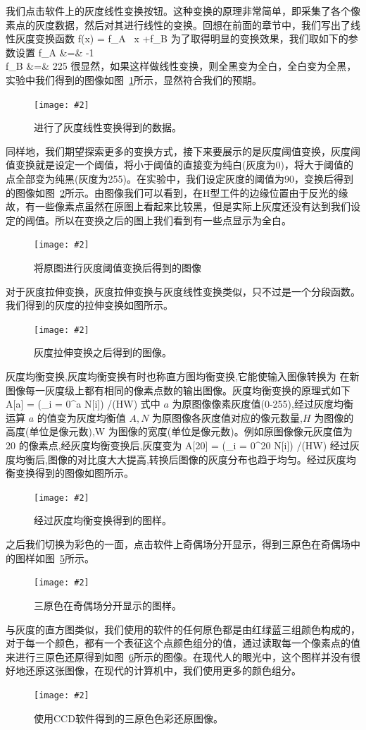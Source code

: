 \documentclass{ctexart}
\newcommand{\cpic}[2]{
\begin{center}
\texttt{[image: \#2]}
\end{center}
}
\newcommand{\cpicn}[3]
{
\begin{figure}[H]
\cpic{#1}{#2}
\caption{#3\label{#2}}
\end{figure}
}
\begin{document}
我们点击软件上的灰度线性变换按钮。这种变换的原理非常简单，即采集了各个像素点的灰度数据，然后对其进行线性的变换。回想在前面的章节中，我们写出了线性灰度变换函数
\beq
f(x) = f_A \, x +f_B
\eeq
为了取得明显的变换效果，我们取如下的参数设置
\bea
f_A &=& -1\\
f_B &=& 225
\eea
很显然，如果这样做线性变换，则全黑变为全白，全白变为全黑，实验中我们得到的图像如图~\ref{CCD/灰度线性变换}所示，显然符合我们的预期。
\cpicn{0.5}{CCD/灰度线性变换}{进行了灰度线性变换得到的数据。}

同样地，我们期望探索更多的变换方式，接下来要展示的是灰度阈值变换，灰度阈值变换就是设定一个阈值，将小于阈值的直接变为纯白(灰度为0)，将大于阈值的点全部变为纯黑(灰度为255)。在实验中，我们设定灰度的阈值为90，变换后得到的图像如图~\ref{CCD/灰度阈值变换}所示。由图像我们可以看到，在H型工件的边缘位置由于反光的缘故，有一些像素点虽然在原图上看起来比较黑，但是实际上灰度还没有达到我们设定的阈值。所以在变换之后的图上我们看到有一些点显示为全白。
\cpicn{0.5}{CCD/灰度阈值变换}{将原图进行灰度阈值变换后得到的图像}

对于灰度拉伸变换，灰度拉伸变换与灰度线性变换类似，只不过是一个分段函数。我们得到的灰度的拉伸变换如图所示。
\cpicn{0.5}{CCD/灰度拉伸变换}{灰度拉伸变换之后得到的图像。}

灰度均衡变换,灰度均衡变换有时也称直方图均衡变换,它能使输入图像转换为
在新图像每一灰度级上都有相同的像素点数的输出图像。灰度均衡变换的原理式如下
\beq
A[a] = \left(\sum_{i = 0}^a  N[i]\right) /(H\cdot W)
\eeq
式中 $a$ 为原图像像素灰度值(0-255),经过灰度均衡运算 $a$ 的值变为灰度均衡值 $A,N$ 为原图像各灰度值对应的像元数量,$H$ 为图像的高度(单位是像元数),W 为图像的宽度(单位是像元数)。例如原图像像元灰度值为 20 的像素点,经灰度均衡变换后,灰度变为
\beq
A[20] = \left(\sum_{i = 0}^{20}  N[i]\right) /(H\cdot W)
\eeq
经过灰度均衡后,图像的对比度大大提高,转换后图像的灰度分布也趋于均匀。经过灰度均衡变换得到的图像如图所示。
\cpicn{0.5}{CCD/灰度均衡变换直方图}{经过灰度均衡变换得到的图样。}

之后我们切换为彩色的一面，点击软件上奇偶场分开显示，得到三原色在奇偶场中的图样如图~\ref{CCD/三原色奇偶场}所示。
\cpicn{0.5}{CCD/三原色奇偶场}{三原色在奇偶场分开显示的图样。}

与灰度的直方图类似，我们使用的软件的任何原色都是由红绿蓝三组颜色构成的，对于每一个颜色，都有一个表征这个点颜色组分的值，通过读取每一个像素点的值来进行三原色还原得到如图~\ref{CCD/三原色色彩还原}所示的图像。在现代人的眼光中，这个图样并没有很好地还原这张图像，在现代的计算机中，我们使用更多的颜色组分。
\cpicn{0.5}{CCD/三原色色彩还原}{使用CCD软件得到的三原色色彩还原图像。}
\end{document}
